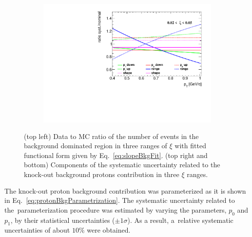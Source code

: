 \begin{figure}[h!]
\begin{subfigure}{.49\textwidth}
 	\end{subfigure}
 	\begin{subfigure}{.49\textwidth}
 		\includegraphics[width=\textwidth,page=3]{chapters/chrgSTAR/img/DCAproton/p_bkg.pdf}
 	\end{subfigure}
 	\caption{(top left) Data to MC ratio of  the  number of events in the background dominated region in three ranges of $\xi$ with fitted functional form given by Eq.~\eqref{eq:slopeBkgFit}. (top right and bottom) Components of the systematic uncertainty related to the  knock-out background protons contribution in three $\xi$ ranges. }
 	\label{fig:protonBkgSyst}
 	
 	\vspace{-1.5cm}
 \end{figure}

The  knock-out proton background contribution was  parameterized as  it is shown in  Eq.~\eqref{eq:protonBkgParametrization}. The systematic uncertainty related to the~parameterization procedure was estimated by varying the   parameters, $p_0$ and $p_1$, by their statistical uncertainties ($\pm1\sigma$).  As a result, a~relative systematic uncertainties of about $10\%$ were obtained.

